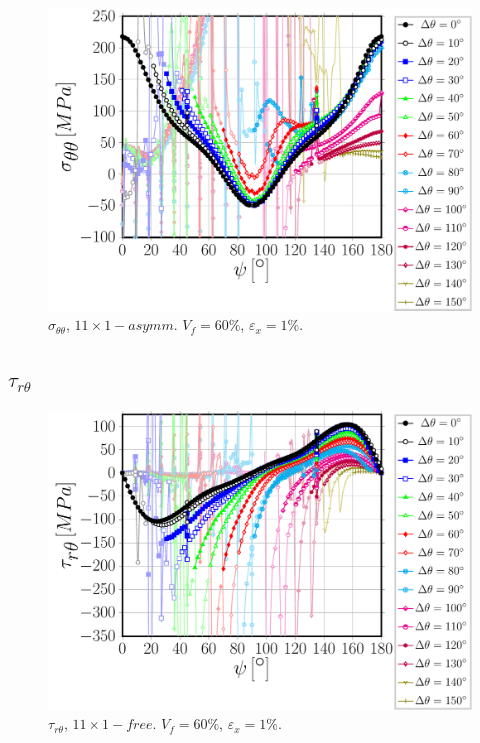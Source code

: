 \documentclass[review]{elsarticle}
\begin{document}
\begin{figure}[!h]
\centering
\includegraphics[width=\textwidth]{S5A0asymm-circum-sigmatt.pdf}
\caption{$\sigma_{\theta\theta}$, $11\times 1-asymm$. $V_{f}=60\%$, $\varepsilon_{x}=1\%$.}\label{}
\end{figure}

\subsection{$\tau_{r\theta}$}

\begin{figure}[!h]
\centering
\includegraphics[width=\textwidth]{S5A0free-circum-taurt.pdf}
\caption{$\tau_{r\theta}$, $11\times 1-free$. $V_{f}=60\%$, $\varepsilon_{x}=1\%$.}\label{}
\end{figure}
\end{document}
